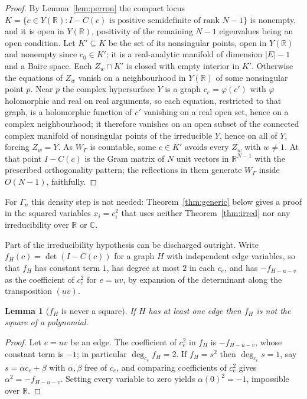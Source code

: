 \documentclass[11pt]{article}
\newtheorem{lemma}[theorem]{Lemma}
\theoremstyle{definition}
\theoremstyle{remark}
\theoremstyle{definition}
\newcommand{\R}{\mathbb{R}}
\newcommand{\C}{\mathbb{C}}
\begin{document}
\begin{proof}
By Lemma~\ref{lem:perron} the compact locus
$K=\{c\in Y(\mathbb{R}):I-C(c)\text{ is positive semidefinite of rank }N-1\}$ is nonempty, and
it is open in $Y(\R)$, positivity of the remaining $N-1$ eigenvalues being an open condition. Let
$K'\subseteq K$ be the set of its nonsingular points, open in $Y(\R)$ and nonempty since
$c_0\in K'$; it is a real-analytic manifold of dimension $|E|-1$ and a Baire space. Each
$Z_w\cap K'$ is closed with empty interior in $K'$. Otherwise the equations of $Z_w$ vanish on a
neighbourhood in $Y(\R)$ of some nonsingular point $p$. Near $p$ the complex hypersurface $Y$ is a
graph $c_e=\varphi(c')$ with $\varphi$ holomorphic and real on real arguments, so each equation,
restricted to that graph, is a holomorphic function of $c'$ vanishing on a real open set, hence on
a complex neighbourhood; it therefore vanishes on an open subset of the connected complex manifold
of nonsingular points of the irreducible $Y$, hence on all of $Y$, forcing $Z_w=Y$. As $W_\Gamma$
is countable, some $c\in K'$ avoids every $Z_w$ with $w\ne1$. At that point $I-C(c)$ is the Gram
matrix of $N$ unit vectors in $\mathbb{R}^{N-1}$ with the prescribed orthogonality pattern; the
reflections in them generate $W_\Gamma$ inside $O(N-1)$, faithfully.
\end{proof}

\noindent For $\Gamma_n$ this density step is not needed: Theorem~\ref{thm:generic} below gives a
proof in the squared variables $x_i=c_i^2$ that uses neither Theorem~\ref{thm:irred} nor any
irreducibility over $\R$ or $\C$.

Part of the irreducibility hypothesis can be discharged outright. Write
$f_H(c)=\det(I-C(c))$ for a graph $H$ with independent edge variables, so that $f_H$ has constant
term $1$, has degree at most $2$ in each $c_e$, and has $-f_{H-u-v}$ as the coefficient of $c_e^2$
for $e=uv$, by expansion of the determinant along the transposition $(uv)$.

\begin{lemma}[$f_H$ is never a square]\label{lem:nosquare}
If $H$ has at least one edge then $f_H$ is not the square of a polynomial.
\end{lemma}

\begin{proof}
Let $e=uv$ be an edge. The coefficient of $c_e^2$ in $f_H$ is $-f_{H-u-v}$, whose constant term is
$-1$; in particular $\deg_{c_e}f_H=2$. If $f_H=s^2$ then $\deg_{c_e}s=1$, say $s=\alpha c_e+\beta$
with $\alpha,\beta$ free of $c_e$, and comparing coefficients of $c_e^2$ gives
$\alpha^2=-f_{H-u-v}$. Setting every variable to zero yields $\alpha(0)^2=-1$, impossible over
$\mathbb{R}$.
\end{proof}
\end{document}
